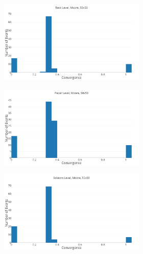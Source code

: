 \documentclass[a4paper, 11pt]{article}
\begin{document}
\begin{figure}[H]
\begin{subfigure}{.65\textwidth}
	\begin{subfigure}{1\textwidth}
		\includegraphics[width=1\linewidth]{50x50_60RockDist_RockHG}
	\end{subfigure}

	\begin{subfigure}{1\textwidth}
		\includegraphics[width=1\linewidth]{50x50_60RockDist_PaperHG}
	\end{subfigure}
	
	\begin{subfigure}{1\textwidth}
		\includegraphics[width=1\linewidth]{50x50_60RockDist_ScissorsHG}
	\end{subfigure}	
	

\end{subfigure}
\end{figure}
\end{document}
